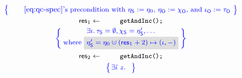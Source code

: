 \begin{figure}
\centering
%    
\[
\!\!\!
{\small{
\begin{array}{c}
  \spec{~
    \mbox{{\normalsize{\eqref{eq:qc-spec}'}}s precondition with $\gists := \gist_0$, $\gisto :=
      \histo$, and $\ikno := \tkno$}~}
\\\\[-6pt]
\res_1 \Asgn \esc{getAndInc();}
\\[3pt]
\spec{\!\!
\begin{array}{c}
   \exists \ikn \ldot 
   \tkns = \emptyset, 
   \hists = \gists',
   \ldots
   \\[2pt]
   \mbox{where $\gbm{\gists' = \gist_0 \hunion (\res_1 + 2) \hpts
       (\ikn, -)}$} 
  \end{array}
  \!\!}%
\\\\[-5pt] 
\res_2 \Asgn \esc{getAndInc();}
\\[3pt]
\spec{\!\!\!
\begin{array}{c}
  \exists \iknh~z \ldot     

\end{array}}
\end{array}}}\]
\end{figure}
